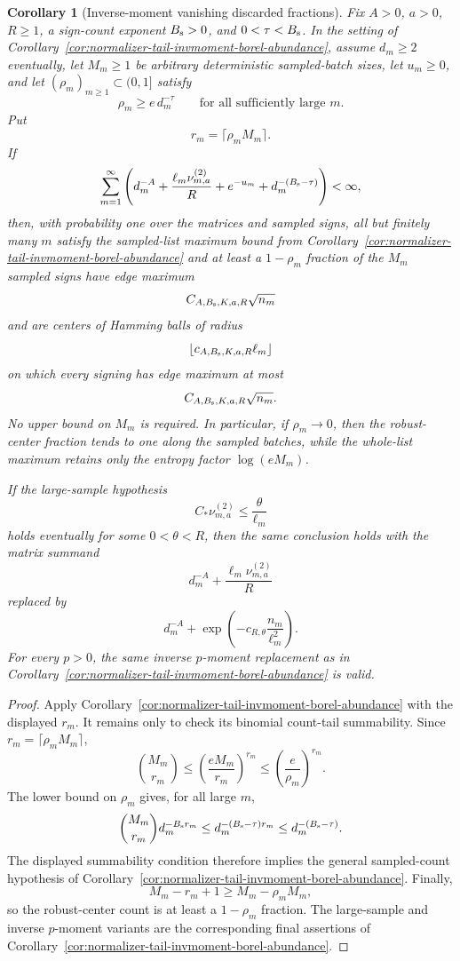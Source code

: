 \documentclass[11pt]{amsart}
\numberwithin{equation}{section}
\newtheorem{corollary}[theorem]{Corollary}
\theoremstyle{definition}
\theoremstyle{remark}
\begin{document}
\begin{corollary}[Inverse-moment vanishing discarded fractions]
\label{cor:normalizer-tail-invmoment-borel-vanishing-fractions}
Fix \(A>0\), \(a>0\), \(R\ge1\), a sign-count exponent \(B_{\rm s}>0\),
and \(0<\tau<B_{\rm s}\).  In the setting of
Corollary~\ref{cor:normalizer-tail-invmoment-borel-abundance}, assume
\(d_m\ge2\) eventually, let \(M_m\ge1\) be arbitrary deterministic sampled-batch
sizes, let \(u_m\ge0\), and let \((\rho_m)_{m\ge1}\subset(0,1]\) satisfy
\[
  \rho_m\ge e\,d_m^{-\tau}
  \qquad\text{for all sufficiently large }m.
\]
Put
\[
  r_m=\lceil\rho_mM_m\rceil .
\]
If
\[
  \sum_{m=1}^{\infty}
  \left(
  d_m^{-A}+\frac{\ell_m\nu_{m,a}^{(2)}}{R}
  +e^{-u_m}+d_m^{-(B_{\rm s}-\tau)}
  \right)<\infty,
\]
then, with probability one over the matrices and sampled signs, all but
finitely many \(m\) satisfy the sampled-list maximum bound from
Corollary~\ref{cor:normalizer-tail-invmoment-borel-abundance} and at least a
\(1-\rho_m\) fraction of the \(M_m\) sampled signs have edge maximum
\[
  C_{A,B_{\rm s},K,a,R}\sqrt{n_m}
\]
and are centers of Hamming balls of radius
\[
  \left\lfloor c_{A,B_{\rm s},K,a,R}\ell_m\right\rfloor
\]
on which every signing has edge maximum at most
\[
  C_{A,B_{\rm s},K,a,R}\sqrt{n_m}.
\]
No upper bound on \(M_m\) is required.  In particular, if \(\rho_m\to0\), then
the robust-center fraction tends to one along the sampled batches, while the
whole-list maximum retains only the entropy factor \(\log(eM_m)\).

If the large-sample hypothesis
\[
  C_*\nu_{m,a}^{(2)}\le\frac{\theta}{\ell_m}
\]
holds eventually for some \(0<\theta<R\), then the same conclusion holds with
the matrix summand
\[
  d_m^{-A}+\frac{\ell_m\nu_{m,a}^{(2)}}{R}
\]
replaced by
\[
  d_m^{-A}+\exp\left(-c_{R,\theta}\frac{n_m}{\ell_m^2}\right).
\]
For every \(p>0\), the same inverse \(p\)-moment replacement as in
Corollary~\ref{cor:normalizer-tail-invmoment-borel-abundance} is valid.
\end{corollary}

\begin{proof}
Apply Corollary~\ref{cor:normalizer-tail-invmoment-borel-abundance} with the
displayed \(r_m\).  It remains only to check its binomial count-tail summability.
Since \(r_m=\lceil\rho_mM_m\rceil\),
\[
  \binom{M_m}{r_m}
  \le \left(\frac{eM_m}{r_m}\right)^{r_m}
  \le \left(\frac e{\rho_m}\right)^{r_m}.
\]
The lower bound on \(\rho_m\) gives, for all large \(m\),
\[
  \binom{M_m}{r_m}d_m^{-B_{\rm s}r_m}
  \le d_m^{-(B_{\rm s}-\tau)r_m}
  \le d_m^{-(B_{\rm s}-\tau)}.
\]
The displayed summability condition therefore implies the general sampled-count
hypothesis of Corollary~\ref{cor:normalizer-tail-invmoment-borel-abundance}.
Finally,
\[
  M_m-r_m+1\ge M_m-\rho_mM_m,
\]
so the robust-center count is at least a \(1-\rho_m\) fraction.  The
large-sample and inverse \(p\)-moment variants are the corresponding final
assertions of Corollary~\ref{cor:normalizer-tail-invmoment-borel-abundance}.
\end{proof}
\end{document}
